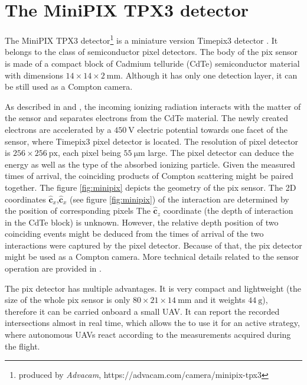 \section{The MiniPIX TPX3 detector} %
The MiniPIX TPX3 detector\footnote{produced by \textit{Advacam}, https://advacam.com/camera/minipix-tpx3} is a miniature version Timepix3 detector \cite{timepix3}.
It belongs to the class of semiconductor pixel detectors.
The body of the \ac{pix} sensor is made of a compact block of Cadmium telluride (CdTe) semiconductor material with dimensions $14 \times 14 \times 2 \ \si{\milli\meter}$.
Although it has only one detection layer, it can be still used as a Compton camera.

As described in \cite{baca2021gamma} and \cite{baca2019timepix}, the incoming ionizing radiation interacts with the matter of the sensor and separates electrons from the CdTe material.
The newly created electrons are accelerated by a $\SI{450}{\volt}$ electric potential towards one facet of the sensor, where Timepix3 pixel detector is located.
The resolution of pixel detector is $256 \times 256\ \mathrm{px}$, each pixel being $55\ \si{\micro\meter}$ large.
The pixel detector can deduce the energy as well as the type of the absorbed ionizing particle.
Given the measured times of arrival, the coinciding products of Compton scattering might be paired together.
The figure \ref{fig:minipix} depicts the geometry of the \ac{pix} sensor.
The 2D coordinates $\mathbf{\hat{c}}_{x}$,$\mathbf{\hat{c}}_{x}$ (see figure \ref{fig:minipix}) of the interaction are determined by the position of corresponding pixels
The $\mathbf{\hat{c}}_{z}$ coordinate (the depth of interaction in the CdTe block) is unknown.
However, the relative depth position of two coinciding events might be deduced from the times of arrival of the two interactions were captured by the pixel detector.
Because of that, the \ac{pix} detector might be used as a Compton camera.
More technical details related to the sensor operation are provided in \cite{baca2019timepix}.

The \ac{pix} detector has multiple advantages.
It is very compact and lightweight (the size of the whole \ac{pix} sensor is only $80 \times 21 \times 14 \ \si{\milli\meter}$ and it weights $\SI{44}{\gram}$), therefore it can be carried onboard a small \ac{UAV}.
It can report the recorded intersections almost in real time, which allows the to use it for an active strategy, where autonomous \ac{UAV}s react according to the measurements acquired during the flight.

